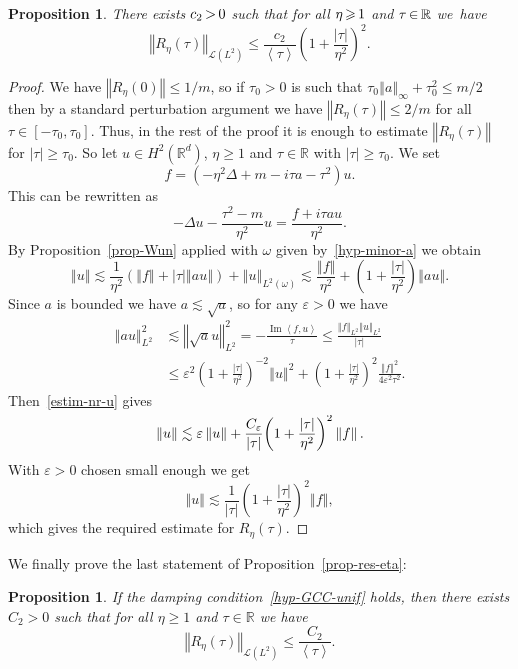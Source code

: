\documentclass[11pt]{article}
\newtheorem{prop}[theo]{Proposition}
\theoremstyle{definition}
\numberwithin{equation}{section}
\numberwithin{figure}{section}
\numberwithin{table}{section}
\newcommand{\abs}[1]{\left\vert #1\right\vert}
\newcommand{\nr}[1]{\left\Vert #1\right\Vert}
\newcommand{\innp}[2]{\left< #1, #2 \right>}
\newcommand{\pppg}[1] {\left< #1 \right>}
\renewcommand{\leq}{\leqslant}
\renewcommand{\geq}{\geqslant}
\newcommand{\1}{\mathds 1}
\DeclareMathOperator{\Imop}{Im}
\renewcommand{\Im}{\Imop}
\newcommand{\R}{\mathbb{R}}
\newcommand{\D}{\Delta}
\newcommand{\e}{\varepsilon}
\renewcommand{\t}{\tau}
\renewcommand{\o}{\omega}
\newcommand{\Lc}{{\mathcal L}}
\newcommand*{\Mk}{\mkern -2mu}
\begin{document}
\begin{prop}\label{prop-estim-Reta}
There exists $c_2 \Mk>\Mk 0$ such that for all $\eta \Mk\geq\Mk 1$ and $\t \Mk\in\Mk \R$ we~have
\[
\nr{R_\eta(\t)}_{\Lc(L^2)} \leq \frac {c_2}{\pppg \tau} \left(1 + \frac {\abs \t}{\eta^2} \right)^2.
\]
\end{prop}

\begin{proof}
We have $\nr{R_\eta(0)} \leq 1/m$, so if $\t_0 > 0$ is such that $\t_0 \nr{a}_\infty + \t_0^2 \leq m/2$ then by a standard perturbation argument we have $\nr{R_\eta(\t)} \leq 2/m$ for all $\t \in [-\t_0,\t_0]$. Thus, in the rest of the proof it is enough to estimate $\nr{R_\eta(\t)}$ for $\abs \t \geq \t_0$. So let $u \in H^2(\R^d)$, $\eta \geq 1$ and $\t \in \R$ with $\abs \t \geq \t_0$. We set
\begin{equation*}
f = (-\eta^2 \D + m - i \t a - \t^2) u.
\end{equation*}
This can be rewritten as
\[
-\D u - \frac {\t^2-m} {\eta^2} u = \frac{f + i\t a u}{\eta^2}.
\]
By Proposition~\ref{prop-Wun} applied with $\o$ given by~\eqref{hyp-minor-a} we obtain
\begin{equation}\label{estim-nr-u}
\nr{u} \lesssim \frac 1 {\eta^2} \left(\nr{f} + \abs \t \nr{au} \right) + \nr{u}_{L^2(\o)} \lesssim \frac {\nr{f}}{\eta^2} + \left(1+\frac {\abs \t}{\eta^2} \right) \nr{a u}.
\end{equation}
Since $a$ is bounded we have $a \lesssim \sqrt a$, so for any $\e > 0$ we have
\begin{align*}
\nr{a u}_{L^2}^2 & \lesssim \nr{\sqrt a u}_{L^2}^2 = - \frac {\Im \innp{f}{u}}{\t} \leq \frac {\nr f_{L^2} \nr u_{L^2}} {\abs \t}\\
& \leq \e^2 \left(1 + \frac {\abs \t}{\eta^2} \right)^{-2} \nr{u}^2 + \left(1 + \frac {\abs \t}{\eta^2} \right)^2 \frac {\nr{f}^2}{4\e^2 \tau^2}.
\end{align*}
Then~\eqref{estim-nr-u} gives
\[
\nr{u} \lesssim \e \nr{u} + \frac {C_\e}{\abs \tau} \smash{\left(1 + \frac {\abs \t}{\eta^2} \right)^2} \nr{f}.
\]
With $\e > 0$ chosen small enough we get
\[
\nr{u} \lesssim \frac {1}{\abs \tau} {\left(1 + \frac {\abs \t}{\eta^2} \right)^2}\nr{f},
\]
which gives the required estimate for $R_\eta(\t)$.
\end{proof}


We finally prove the last statement of Proposition~\ref{prop-res-eta}:

\begin{prop}\label{prop-estim-Reta-GCC}
If the damping condition~\eqref{hyp-GCC-unif} holds, then there exists $C_2 > 0$ such that for all $\eta \geq 1$ and $\t \in \R$ we have
\[
\nr{R_\eta(\t)}_{\Lc(L^2)} \leq \frac {C_2} {\pppg \t}.
\]
\end{prop}
\end{document}
